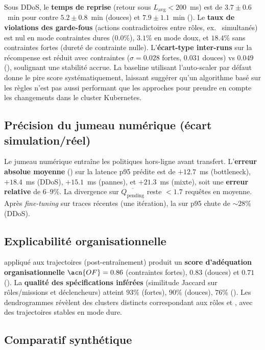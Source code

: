 Sous DDoS, le \textbf{temps de reprise} (retour sous $L_{\text{avg}}<200$~ms) est de $3.7 \pm 0.6$~min pour  contre $5.2 \pm 0.8$~min (douces) et $7.9 \pm 1.1$~min ().
Le \textbf{taux de violations des garde-fous} (actions contradictoires entre rôles, ex.~ simultanés) est nul en mode contraintes dures ($0.0\%$), $3.1\%$ en mode doux, et $18.4\%$ sans contraintes fortes (dureté de contrainte nulle).
L'\textbf{écart-type inter-runs} sur la récompense est réduit avec contraintes ($\sigma=0.028$ fortes, $0.031$ douces) vs $0.049$ (), soulignant une stabilité accrue. La baseline utilisant l'auto-scaler par défaut  donne le pire score systématiquement, laissant suggérer qu'un algorithme basé sur les règles n'est pas aussi performant que les approches  pour prendre en compte les changements dans le cluster Kubernetes.

\subsection*{Précision du jumeau numérique (écart simulation/réel)}

Le jumeau numérique entraîne les politiques hors-ligne avant transfert.
L'\textbf{erreur absolue moyenne} () sur la latence p95 prédite est de $+12.7$~ms (bottleneck), $+18.4$~ms (DDoS), $+15.1$~ms (pannes), et $+21.3$~ms (mixte), soit une \textbf{erreur relative} de $6$--$9\%$.
La divergence sur $\overline{Q_{\text{pending}}}$ reste $<1.7$ requêtes en moyenne.
Après \textit{fine-tuning} sur traces récentes (une itération), la  sur p95 chute de $\sim 28\%$ (DDoS).

\subsection*{Explicabilité organisationnelle}

 appliqué aux trajectoires (post-entraînement) produit un \textbf{score d'adéquation organisationnelle} $\acn{OF}=0.86$ (contraintes fortes), $0.83$ (douces) et $0.71$ ().
La \textbf{qualité des spécifications inférées} (similitude Jaccard sur rôles/missions et déclencheurs) atteint $93\%$ (fortes), $90\%$ (douces), $76\%$ ().
Les dendrogrammes révèlent des clusters distincts correspondant aux rôles  et , avec des trajectoires stables en mode dure.

\subsection*{Comparatif synthétique}


